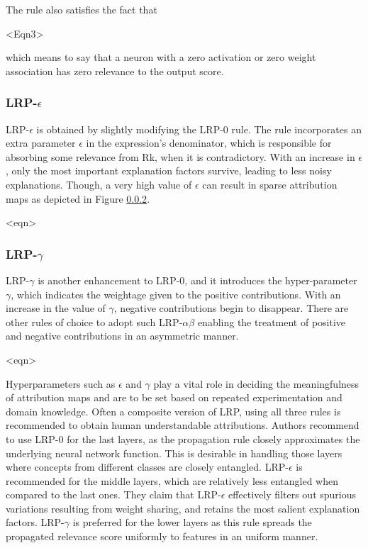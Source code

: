 \documentclass[../report.tex]{subfiles}
\begin{document}
The rule also satisfies the fact that 

<Eqn3>

which means to say that a neuron with a zero activation or zero weight association has zero relevance to the output score.

\subsubsection{LRP-$\epsilon$}

LRP-$\epsilon$ is obtained by slightly modifying the LRP-0 rule. The rule incorporates an extra parameter $\epsilon$ in the expression’s denominator, which is responsible for absorbing some relevance from Rk, when it is contradictory. With an increase in $\epsilon$, only the most important explanation factors survive, leading to less noisy explanations. Though, a very high value of $\epsilon$ can result in sparse attribution maps as depicted in Figure \ref{}.

<eqn>

\subsubsection{LRP-$\gamma$}
LRP-$\gamma$ is another enhancement to LRP-0, and it introduces the hyper-parameter $\gamma$, which indicates the weightage given to the positive contributions. With an increase in the value of $\gamma$, negative contributions begin to disappear. There are other rules of choice to adopt such LRP-$\alpha\beta$ enabling the treatment of positive and negative contributions in an asymmetric manner.

<eqn>


Hyperparameters such as $\epsilon$ and $\gamma$ play a vital role in deciding the meaningfulness of attribution maps and are to be set based on repeated experimentation and domain knowledge. Often a composite version of LRP, using all three rules is recommended to obtain human understandable attributions.
Authors recommend to  use LRP-0 for the last layers, as the propagation rule closely approximates the underlying  neural network function. This is desirable in handling those layers where concepts from different classes are closely entangled. LRP-$\epsilon$ is recommended for the middle layers, which are relatively less entangled when compared to the last ones. They claim that LRP-$\epsilon$ effectively filters out spurious variations resulting from weight sharing, and retains the most salient explanation factors. LRP-$\gamma$ is preferred for the lower layers as this rule spreads the propagated relevance score uniformly to features in an uniform manner. 
\end{document}
